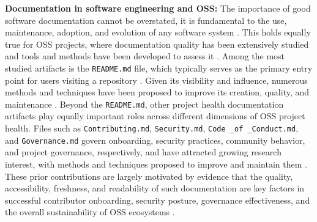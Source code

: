 \documentclass[10pt,conference]{IEEEtran}
\begin{document}
\noindent \textbf{ {Documentation in software engineering and OSS:}}
The importance of good software documentation cannot be overstated, it is fundamental to the use, maintenance, adoption, and evolution of any software system \cite{aghajani2020software}. This holds equally true for OSS projects, where documentation quality has been extensively studied and tools and methods have been developed to assess it \cite{aversano2017evaluating,carvalho2013open}.
Among the most studied artifacts is the \texttt{README.md} file, which typically serves as the primary entry point for users visiting a repository \cite{adejumo2026bridging}. Given its visibility and influence, numerous methods and techniques have been proposed to improve its creation, quality, and maintenance \cite{liu2022readme,gaughan2025introduction}. Beyond the \texttt{README.md}, other project health documentation artifacts play equally important roles across different dimensions of OSS project health. Files such as \texttt{Contributing.md}, \texttt{Security.md}, \texttt{Code \_of \_Conduct.md}, and \texttt{Governance.md} govern onboarding, security practices, community behavior, and project governance, respectively, and have attracted growing research interest, with methods and techniques proposed to improve and maintain them \cite{kobayakawa2017github,adejumo2024towards,tufano2024unveiling}.
These prior contributions are largely motivated by evidence that the quality, accessibility, freshness, and readability of such documentation are key factors in successful contributor onboarding, security posture, governance effectiveness, and the overall sustainability of OSS ecosystems \cite{steinmacher2014attracting, adejumo2025explaining,steinmacher2015social,adejumo2026bridging,choetkiertikul2026security}. 
\end{document}
